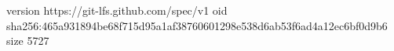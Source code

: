 version https://git-lfs.github.com/spec/v1
oid sha256:465a931894be68f715d95a1af38760601298e538d6ab53f6ad4a12ec6bf0d9b6
size 5727
